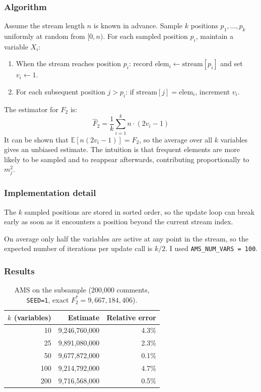 \documentclass[11pt,a4paper]{article}
\begin{document}
\subsubsection*{Algorithm}
Assume the stream length $n$ is known in advance. Sample $k$ positions
$p_1, \ldots, p_k$ uniformly at random from $[0, n)$.
For each sampled position $p_i$, maintain a variable $X_i$:
\begin{enumerate}
  \item When the stream reaches position $p_i$: record $\mathrm{elem}_i \leftarrow \mathrm{stream}[p_i]$ and set $v_i \leftarrow 1$.
  \item For each subsequent position $j > p_i$: if $\mathrm{stream}[j] = \mathrm{elem}_i$, increment $v_i$.
\end{enumerate}
The estimator for $F_2$ is:
\[
  \hat{F}_2 = \frac{1}{k}\sum_{i=1}^{k} n\cdot(2v_i - 1)
\]
It can be shown that $\mathbb{E}[n(2v_i-1)] = F_2$, so the average over all $k$
variables gives an unbiased estimate. The intuition is that frequent elements are
more likely to be sampled and to reappear afterwards, contributing proportionally to $m_j^2$.

\subsubsection*{Implementation detail}
The $k$ sampled positions are stored in sorted order, so the update loop can break
early as soon as it encounters a position beyond the current stream index.

On average only half the variables are active at any point in the stream, so the
expected number of iterations per update call is $k/2$. I used \texttt{AMS\_NUM\_VARS = 100}.

\subsubsection*{Results}

\begin{table}[H]
\centering
\begin{tabular}{rrr}
\toprule
$k$ (variables) & Estimate & Relative error \\
\midrule
 10 & 9,246,760,000 & 4.3\% \\
 25 & 9,891,080,000 & 2.3\% \\
 50 & 9,677,872,000 & 0.1\% \\
100 & 9,214,792,000 & 4.7\% \\
200 & 9,716,568,000 & 0.5\% \\
\bottomrule
\end{tabular}
\caption{AMS on the subsample (200,000 comments, \texttt{SEED=1}, exact $F_2^* = 9{,}667{,}184{,}406$).}
\label{tab:ams_subsample}
\end{table}
\end{document}
